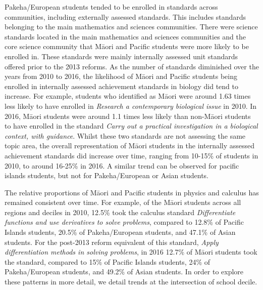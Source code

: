 Pakeha/European students tended to be enrolled in standards across communities, including externally assessed standards. This includes standards belonging to the main mathematics and sciences communities. There were science standards located in the main mathematics and sciences communities and the core science community that M\={a}ori and Pacific students were more likely to be enrolled in. These standards were mainly internally assessed unit standards  offered prior to the 2013 reforms. As the number of standards diminished over the years from 2010 to 2016, the likelihood of M\={a}ori and Pacific students being enrolled in internally assessed achievement standards in biology did tend to increase. For example, students who identified as M\={a}ori were around 1.63 times less likely to have enrolled in \textit{Research a contemporary biological issue} in 2010. In 2016, M\={a}ori students were around 1.1 times less likely than non-M\={a}ori students to have enrolled in the standard \textit{Carry out a practical investigation in a biological context, with guidance}. Whilst these two standards are not assessing the same topic area, the overall representation of M\={a}ori students in the internally assessed achievement standards did increase over time, ranging from 10-15\% of students in 2010, to around 16-25\% in 2016. A similar trend can be observed for pacific islands students, but not for Pakeha/European or Asian students. 

The relative proportions of M\={a}ori and Pacific students in physics and calculus has remained consistent over time. For example, of the M\={a}ori students across all regions and deciles in 2010, 12.5\% took the calculus standard \textit{Differentiate functions and use derivatives to solve problems}, compared to 12.8\% of Pacific Islands students, 20.5\% of Pakeha/European students, and 47.1\% of Asian students. For the post-2013 reform equivalent of this standard, \textit{Apply differentiation methods in solving problems}, in 2016 12.7\% of M\={a}ori students took the standard, compared to 15\% of Pacific Islands students, 24\% of Pakeha/European students, and 49.2\% of Asian students. In order to explore these patterns in more detail, we detail trends at the intersection of school decile. 

